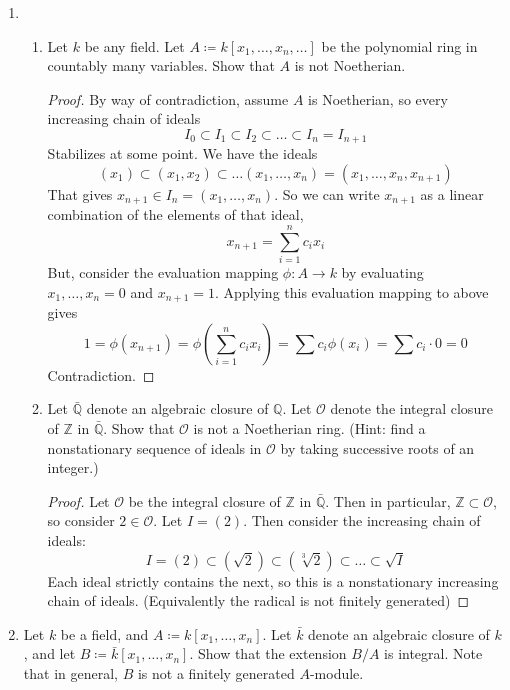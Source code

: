 \documentclass[hidelinks,12pt]{article}
\newcommand{\Z}{\mathbb{Z}}
\newcommand{\Q}{\mathbb{Q}}
\renewcommand{\O}{\mathcal{O}}
\begin{document}
\begin{enumerate}
\begin{enumerate}[label=(\alph*).]
\begin{proof}
           \end{proof} 
            \item 
        \end{enumerate}
    \item \begin{enumerate}[label=(\alph*).]
        \item Let \(k\) be any field. Let \(A\coloneqq k[x_{1},\dots,x_{n},\dots]\) be the polynomial ring in countably many variables. Show that \(A\) is not Noetherian.
        \begin{proof}
            By way of contradiction, assume \(A\) is Noetherian, so every increasing chain of ideals \[
            I_{0}\subset I_{1}\subset I_{2}\subset\dots\subset I_{n}=I_{n+1}
            \]
            Stabilizes at some point. We have the ideals
            \[
                (x_{1})\subset(x_{1},x_{2})\subset\dots(x_{1},\dots,x_{n})=(x_{1},\dots,x_{n},x_{n+1})
            \]
            That gives \(x_{n+1}\in I_{n}=(x_{1},\dots,x_{n})\). So we can write \(x_{n+1}\) as a linear combination of the elements of that ideal,
            \[
                x_{n+1}=\sum_{i=1}^{n} c_{i}x_{i}
            \]
            But, consider the evaluation mapping \(\phi:A\to k\) by evaluating \(x_{1},\dots,x_{n}=0\) and \(x_{n+1}=1\). Applying this evaluation mapping to above gives \[
            1=\phi(x_{n+1})=\phi(\sum_{i=1}^{n} c_{i}x_{i})=\sum c_{i}\phi(x_{i})=\sum c_{i}\cdot0=0
            \]
           Contradiction. 
        \end{proof}
    \item Let \(\bar{\Q}\) denote an algebraic closure of \(\Q\). Let \(\O\) denote the integral closure of \(\Z\) in \(\bar{\Q}\). Show that \(\O\) is not a Noetherian ring. (Hint: find a nonstationary sequence of ideals in \(\O\) by taking successive roots of an integer.)
        \begin{proof}
            Let \(\O\) be the integral closure of \(\Z\) in \(\bar{\Q}\). Then in particular, \(\Z\subset\O\), so consider \(2\in\O\). Let \(I=(2)\). Then consider the increasing chain of ideals:
            \[
                I=(2)\subset(\sqrt{2})\subset(\sqrt[3]{2})\subset\dots\subset\sqrt{I}
            \]
            Each ideal strictly contains the next, so this is a nonstationary increasing chain of ideals. (Equivalently the radical is not finitely generated)
        \end{proof}
    \end{enumerate}
\item Let \(k\) be a field, and \(A\coloneqq k[x_{1},\dots,x_{n}]\). Let \(\bar{k}\) denote an algebraic closure of \(k\), and let \(B\coloneqq \bar{k}[x_{1},\dots,x_{n}]\). Show that the extension \(B/A\) is integral. Note that in general, \(B\) is not a finitely generated \(A\)-module.

\end{enumerate}
\end{document}
